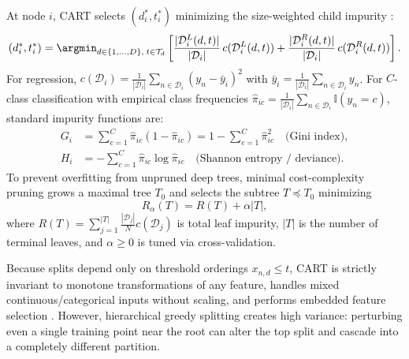 \documentclass[../../../../master.tex]{subfiles}
\begin{document}
\begin{coremath}
At node $i$, CART selects $(d_i^*, t_i^*)$ minimizing the size-weighted child impurity :
\begin{equation}
  (d_i^*, t_i^*) = \argmin_{d \in \{1,\dots,D\},\; t \in \mathcal{T}_d} \left[
    \frac{|\mathcal{D}_i^L(d, t)|}{|\mathcal{D}_i|}\, c(\mathcal{D}_i^L(d, t))
    + \frac{|\mathcal{D}_i^R(d, t)|}{|\mathcal{D}_i|}\, c(\mathcal{D}_i^R(d, t))
  \right].
  \label{eq:trees:cart_objective}
\end{equation}
For regression, $c(\mathcal{D}_i) = \frac{1}{|\mathcal{D}_i|}\sum_{n \in \mathcal{D}_i}(y_n - \bar{y}_i)^2$ with $\bar{y}_i = \frac{1}{|\mathcal{D}_i|}\sum_{n \in \mathcal{D}_i} y_n$. For $C$-class classification with empirical class frequencies $\hat{\pi}_{ic} = \frac{1}{|\mathcal{D}_i|}\sum_{n \in \mathcal{D}_i}\mathbb{I}(y_n = c)$, standard impurity functions are:
\begin{align}
  G_i &= \sum_{c=1}^{C} \hat{\pi}_{ic}(1 - \hat{\pi}_{ic}) = 1 - \sum_{c=1}^{C} \hat{\pi}_{ic}^2 \quad \text{(Gini index)}, \label{eq:trees:gini} \\
  H_i &= -\sum_{c=1}^{C} \hat{\pi}_{ic} \log \hat{\pi}_{ic} \quad \text{(Shannon entropy / deviance)}. \label{eq:trees:entropy}
\end{align}
To prevent overfitting from unpruned deep trees, minimal cost-complexity pruning grows a maximal tree $T_0$ and selects the subtree $T \preceq T_0$ minimizing
\begin{equation}
  R_{\alpha}(T) = R(T) + \alpha |T|,
  \label{eq:trees:ccp}
\end{equation}
where $R(T) = \sum_{j=1}^{|T|} \frac{|\mathcal{D}_j|}{N} c(\mathcal{D}_j)$ is total leaf impurity, $|T|$ is the number of terminal leaves, and $\alpha \ge 0$ is tuned via cross-validation.
\end{coremath}

\begin{intuition}
Because splits depend only on threshold orderings $x_{n,d} \le t$, CART is strictly invariant to monotone transformations of any feature, handles mixed continuous/categorical inputs without scaling, and performs embedded feature selection . However, hierarchical greedy splitting creates high variance: perturbing even a single training point near the root can alter the top split and cascade into a completely different partition.
\end{intuition}
\end{document}
